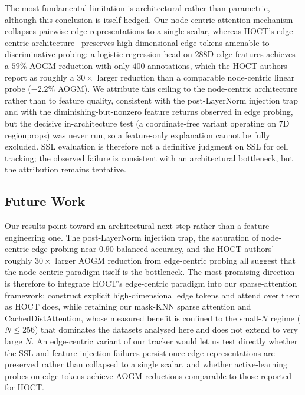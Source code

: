 The most fundamental limitation is architectural rather than parametric, although this conclusion is itself hedged. Our node-centric attention mechanism collapses pairwise edge representations to a single scalar, whereas HOCT's edge-centric architecture~\cite{bragantini2026hoct} preserves high-dimensional edge tokens amenable to discriminative probing: a logistic regression head on $288$D edge features achieves a $59\%$ AOGM reduction with only $400$ annotations, which the HOCT authors report as roughly a $30\times$ larger reduction than a comparable node-centric linear probe ($-2.2\%$ AOGM). We attribute this ceiling to the node-centric architecture rather than to feature quality, consistent with the post-LayerNorm injection trap and with the diminishing-but-nonzero feature returns observed in edge probing, but the decisive in-architecture test (a coordinate-free variant operating on $7$D regionprops) was never run, so a feature-only explanation cannot be fully excluded. SSL evaluation is therefore not a definitive judgment on SSL for cell tracking; the observed failure is consistent with an architectural bottleneck, but the attribution remains tentative.

\subsection{Future Work}

Our results point toward an architectural next step rather than a feature-engineering one. The post-LayerNorm injection trap, the saturation of node-centric edge probing near $0.90$ balanced accuracy, and the HOCT authors' roughly $30\times$ larger AOGM reduction from edge-centric probing all suggest that the node-centric paradigm itself is the bottleneck. The most promising direction is therefore to integrate HOCT's edge-centric paradigm into our sparse-attention framework: construct explicit high-dimensional edge tokens and attend over them as HOCT does, while retaining our mask-KNN sparse attention and CachedDistAttention, whose measured benefit is confined to the small-$N$ regime ($N \leq 256$) that dominates the datasets analysed here and does not extend to very large $N$. An edge-centric variant of our tracker would let us test directly whether the SSL and feature-injection failures persist once edge representations are preserved rather than collapsed to a single scalar, and whether active-learning probes on edge tokens achieve AOGM reductions comparable to those reported for HOCT.

